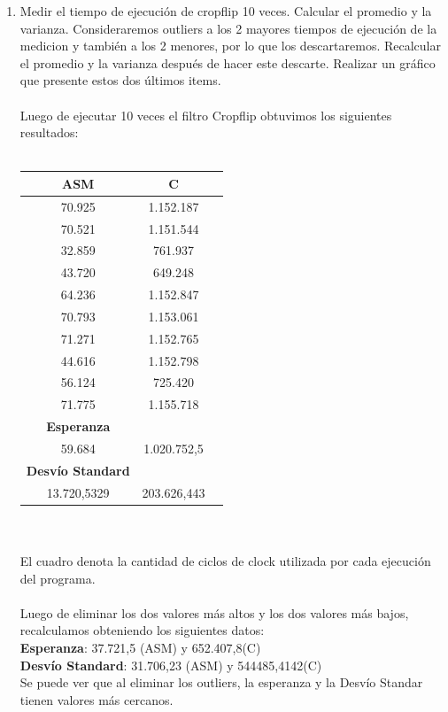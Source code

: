 \begin{enumerate}
    \item Medir el tiempo de ejecución de cropflip 10 veces. Calcular el promedio y la varianza. Consideraremos outliers a los 2 mayores tiempos de ejecución de la medicion y también a los 2 menores, por lo que los descartaremos. Recalcular el promedio y la varianza después de hacer este descarte. Realizar un gráfico que presente estos dos últimos items.\\
\\
Luego de ejecutar 10 veces el filtro Cropflip obtuvimos los siguientes resultados: \\
\\
    	\begin{tabular}[c]{|c|c|c|}
	\hline
		\textbf{ASM} & \textbf{C}\\
		\hline
70.925 &	1.152.187\\
		\hline
70.521 &	1.151.544\\
		\hline
32.859 &	761.937\\
		\hline
43.720 &	649.248\\
		\hline
64.236 &	1.152.847\\
		\hline
70.793 &	1.153.061\\
		\hline
71.271 &	1.152.765\\
		\hline
44.616 &	1.152.798\\
		\hline
56.124 &	725.420\\
		\hline
71.775 &	1.155.718\\
		\hline
	\textbf{Esperanza}	\\
		\hline
59.684 & 1.020.752,5	\\
		\hline
		\textbf{Desvío Standard}	\\
		\hline
13.720,5329 & 203.626,443	\\
		\hline
	\end{tabular}\\\\
	El cuadro denota la cantidad de ciclos de clock utilizada por cada ejecuci\'on del programa. \\
	\\
	Luego de eliminar los dos valores m\'as altos y los dos valores m\'as bajos, recalculamos obteniendo los siguientes datos: \\
	\textbf{Esperanza}: 37.721,5 (ASM) y 652.407,8(C)\\
	\textbf{Desvío Standard}:	31.706,23 (ASM) y 544485,4142(C)\\
	Se puede ver que al eliminar los outliers, la esperanza y la Desvío Standar tienen valores m\'as cercanos. \\

\end{enumerate}
